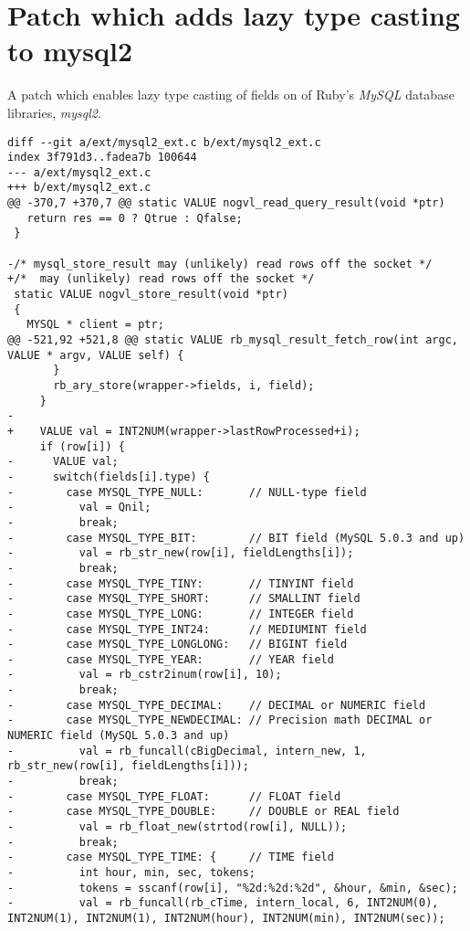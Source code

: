 \chapter{Patch which adds lazy type casting to mysql2} %
\label{ap:ruby19_encoding_patch}

A patch which enables lazy type casting of fields on of Ruby's \textit{MySQL} database libraries, \textit{mysql2}.

\begin{lstlisting}
diff --git a/ext/mysql2_ext.c b/ext/mysql2_ext.c
index 3f791d3..fadea7b 100644
--- a/ext/mysql2_ext.c
+++ b/ext/mysql2_ext.c
@@ -370,7 +370,7 @@ static VALUE nogvl_read_query_result(void *ptr)
   return res == 0 ? Qtrue : Qfalse;
 }
 
-/* mysql_store_result may (unlikely) read rows off the socket */
+/*  may (unlikely) read rows off the socket */
 static VALUE nogvl_store_result(void *ptr)
 {
   MYSQL * client = ptr;
@@ -521,92 +521,8 @@ static VALUE rb_mysql_result_fetch_row(int argc, VALUE * argv, VALUE self) {
       }
       rb_ary_store(wrapper->fields, i, field);
     }
-
+    VALUE val = INT2NUM(wrapper->lastRowProcessed+i);
     if (row[i]) {
-      VALUE val;
-      switch(fields[i].type) {
-        case MYSQL_TYPE_NULL:       // NULL-type field
-          val = Qnil;
-          break;
-        case MYSQL_TYPE_BIT:        // BIT field (MySQL 5.0.3 and up)
-          val = rb_str_new(row[i], fieldLengths[i]);
-          break;
-        case MYSQL_TYPE_TINY:       // TINYINT field
-        case MYSQL_TYPE_SHORT:      // SMALLINT field
-        case MYSQL_TYPE_LONG:       // INTEGER field
-        case MYSQL_TYPE_INT24:      // MEDIUMINT field
-        case MYSQL_TYPE_LONGLONG:   // BIGINT field
-        case MYSQL_TYPE_YEAR:       // YEAR field
-          val = rb_cstr2inum(row[i], 10);
-          break;
-        case MYSQL_TYPE_DECIMAL:    // DECIMAL or NUMERIC field
-        case MYSQL_TYPE_NEWDECIMAL: // Precision math DECIMAL or NUMERIC field (MySQL 5.0.3 and up)
-          val = rb_funcall(cBigDecimal, intern_new, 1, rb_str_new(row[i], fieldLengths[i]));
-          break;
-        case MYSQL_TYPE_FLOAT:      // FLOAT field
-        case MYSQL_TYPE_DOUBLE:     // DOUBLE or REAL field
-          val = rb_float_new(strtod(row[i], NULL));
-          break;
-        case MYSQL_TYPE_TIME: {     // TIME field
-          int hour, min, sec, tokens;
-          tokens = sscanf(row[i], "%2d:%2d:%2d", &hour, &min, &sec);
-          val = rb_funcall(rb_cTime, intern_local, 6, INT2NUM(0), INT2NUM(1), INT2NUM(1), INT2NUM(hour), INT2NUM(min), INT2NUM(sec));

\end{lstlisting}
